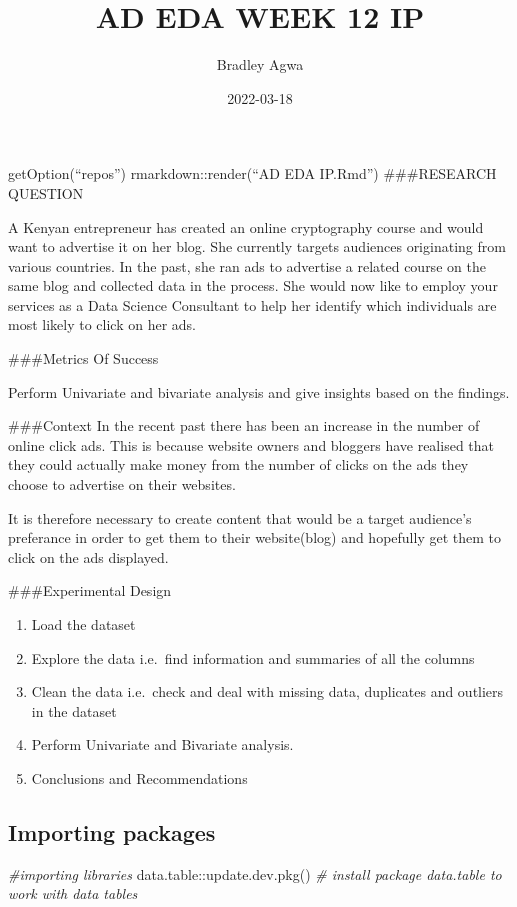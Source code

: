 \documentclass[
]{article}
\title{AD EDA WEEK 12 IP}
\author{Bradley Agwa}
\date{2022-03-18}
\newenvironment{Shaded}{\begin{snugshade}}{\end{snugshade}}
\newcommand{\CommentTok}[1]{\textcolor[rgb]{0.56,0.35,0.01}{\textit{#1}}}
\newcommand{\FunctionTok}[1]{\textcolor[rgb]{0.00,0.00,0.00}{#1}}
\newcommand{\NormalTok}[1]{#1}
\newcommand{\SpecialCharTok}[1]{\textcolor[rgb]{0.00,0.00,0.00}{#1}}
\providecommand{\tightlist}{%
  \setlength{\itemsep}{0pt}\setlength{\parskip}{0pt}}
\begin{document}
\maketitle

getOption(``repos'') rmarkdown::render(``AD EDA IP.Rmd'') \#\#\#RESEARCH
QUESTION

A Kenyan entrepreneur has created an online cryptography course and
would want to advertise it on her blog. She currently targets audiences
originating from various countries. In the past, she ran ads to
advertise a related course on the same blog and collected data in the
process. She would now like to employ your services as a Data Science
Consultant to help her identify which individuals are most likely to
click on her ads.

\#\#\#Metrics Of Success

Perform Univariate and bivariate analysis and give insights based on the
findings.

\#\#\#Context In the recent past there has been an increase in the
number of online click ads. This is because website owners and bloggers
have realised that they could actually make money from the number of
clicks on the ads they choose to advertise on their websites.

It is therefore necessary to create content that would be a target
audience's preferance in order to get them to their website(blog) and
hopefully get them to click on the ads displayed.

\#\#\#Experimental Design

\begin{enumerate}
\def\labelenumi{\arabic{enumi}.}
\tightlist
\item
  Load the dataset
\item
  Explore the data i.e.~find information and summaries of all the
  columns
\item
  Clean the data i.e.~check and deal with missing data, duplicates and
  outliers in the dataset
\item
  Perform Univariate and Bivariate analysis.
\item
  Conclusions and Recommendations
\end{enumerate}

\hypertarget{importing-packages}{%
\subsection{Importing packages}\label{importing-packages}}

\begin{Shaded}
\begin{Highlighting}[]
\CommentTok{\#importing libraries}
\NormalTok{data.table}\SpecialCharTok{::}\FunctionTok{update.dev.pkg}\NormalTok{() }\CommentTok{\# install package data.table to work with data tables}
\end{Highlighting}
\end{Shaded}
\end{document}
